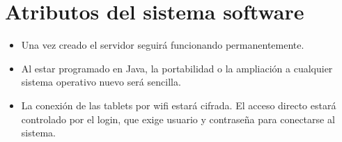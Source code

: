 \documentclass[spanish,a4paper,11pt, twoside]{report}	%
\begin{document}
\section{Atributos del sistema software}
\begin{itemize}
	\item Una vez creado el servidor seguirá funcionando permanentemente.
	\item Al estar programado en Java, la portabilidad o la ampliación a cualquier sistema operativo  nuevo será sencilla. 
	\item La conexión de las tablets por wifi estará cifrada. El acceso directo estará controlado por el login, que exige usuario y contraseña para conectarse al sistema.
\end{itemize}


\newpage
\mbox{}
\thispagestyle{empty}						%
\newpage
\end{document}
